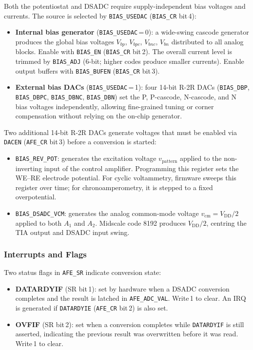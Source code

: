 Both the potentiostat and DSADC require supply-independent bias voltages and currents. The source is selected by \texttt{BIAS\_USEDAC} (\texttt{BIAS\_CR} bit\,4):

\begin{itemize}
    \item \textbf{Internal bias generator} (\texttt{BIAS\_USEDAC}\,=\,0): a wide-swing cascode generator produces the global bias voltages $V_{bp}$, $V_{bpc}$, $V_{bnc}$, $V_{bn}$ distributed to all analog blocks. Enable with \texttt{BIAS\_EN} (\texttt{BIAS\_CR} bit\,2). The overall current level is trimmed by \texttt{BIAS\_ADJ} (6-bit; higher codes produce smaller currents). Enable output buffers with \texttt{BIAS\_BUFEN} (\texttt{BIAS\_CR} bit\,3).
    \item \textbf{External bias DACs} (\texttt{BIAS\_USEDAC}\,=\,1): four 14-bit R-2R DACs (\texttt{BIAS\_DBP}, \texttt{BIAS\_DBPC}, \texttt{BIAS\_DBNC}, \texttt{BIAS\_DBN}) set the P, P-cascode, N-cascode, and N bias voltages independently, allowing fine-grained tuning or corner compensation without relying on the on-chip generator.
\end{itemize}

Two additional 14-bit R-2R DACs generate voltages that must be enabled via \texttt{DACEN} (\texttt{AFE\_CR} bit\,3) before a conversion is started:
\begin{itemize}
    \item \texttt{BIAS\_REV\_POT}: generates the excitation voltage $v_\mathrm{pattern}$ applied to the non-inverting input of the control amplifier. Programming this register sets the WE--RE electrode potential. For cyclic voltammetry, firmware sweeps this register over time; for chronoamperometry, it is stepped to a fixed overpotential.
    \item \texttt{BIAS\_DSADC\_VCM}: generates the analog common-mode voltage $v_\mathrm{cm} = V_\mathrm{DD}/2$ applied to both $A_1$ and $A_2$. Midscale code 8192 produces $V_\mathrm{DD}/2$, centring the TIA output and DSADC input swing.
\end{itemize}

\subsubsection*{Interrupts and Flags}

Two status flags in \texttt{AFE\_SR} indicate conversion state:

\begin{itemize}
    \item \textbf{DATARDYIF} (SR bit\,1): set by hardware when a DSADC conversion completes and the result is latched in \texttt{AFE\_ADC\_VAL}. Write\,1 to clear. An IRQ is generated if \texttt{DATARDYIE} (\texttt{AFE\_CR} bit\,2) is also set.
    \item \textbf{OVFIF} (SR bit\,2): set when a conversion completes while \texttt{DATARDYIF} is still asserted, indicating the previous result was overwritten before it was read. Write\,1 to clear.
\end{itemize}


